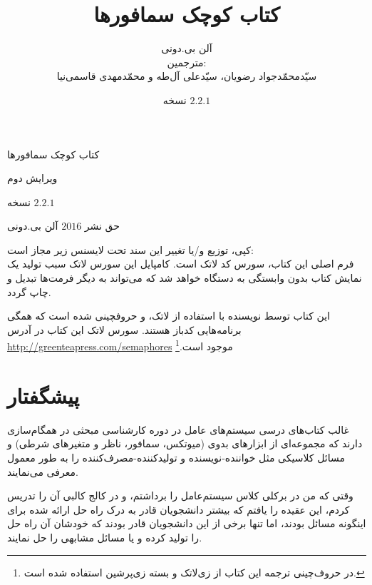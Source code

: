 \documentclass{book}
\title{کتاب کوچک سمافورها}
\author{آلن بی.دونی\\[2cm]
مترجمین:\\
سیّدمحمّدجواد رضویان، سیّدعلی آل‌طه و محمّدمهدی قاسمی‌نیا}
\newcommand{\theversion}{نسخه $2.2.1$}
\begin{document}

\date {\theversion}
\maketitle

\vspace{2in}
\begin{center}
{\Large کتاب کوچک سمافورها}

ویرایش دوم
\vspace{0.25in}

\theversion
\vspace{0.25in}

حق نشر $2016$ آلن بی.دونی
\end{center}
\vspace{0.25in}

کپی، توزیع و/یا تغییر این سند تحت لایسنس زیر مجاز است:\\
فرم اصلی این کتاب، سورس کد لاتک است. کامپایل این سورس لاتک سبب تولید یک نمایش کتاب بدون وابستگی به دستگاه خواهد شد 
که می‌تواند به دیگر فرمت‌ها تبدیل و چاپ گردد. 

این کتاب توسط نویسنده با استفاده از لاتک،  و  حروفچینی شده است که همگی برنامه‌هایی کدباز هستند.
سورس لاتک این کتاب در آدرس \url{http://greenteapress.com/semaphores} موجود است.\footnote{%
در حروف‌چینی ترجمه این کتاب از زی‌لاتک و بسته زی‌پرشین استفاده شده است.}


\frontmatter

\chapter{پیشگفتار}

غالب کتاب‌های درسی سیستم‌های عامل در دوره کارشناسی مبحثی در همگا‌م‌سازی دارند که مجموعه‌ای از  ابزارهای بدوی
(میوتکس، سمافور، ناظر و متغیر‌های شرطی) و مسائل کلاسیکی مثل خواننده-نویسنده و تولیدکننده-مصرف‌کننده را به طور معمول معرفی می‌نمایند. 

وقتی که من در برکلی کلاس سیستم‌عامل را برداشتم، و در کالج کالبی آن را تدریس کردم، 
این عقیده را یافتم که بیشتر دانشجویان قادر به درک راه حل ارائه شده برای اینگونه مسائل بودند، 
اما تنها برخی از این دانشجویان قادر بودند که خودشان آن راه حل را  تولید کرده و یا مسائل مشابهی را حل نمایند. 
\end{document}

